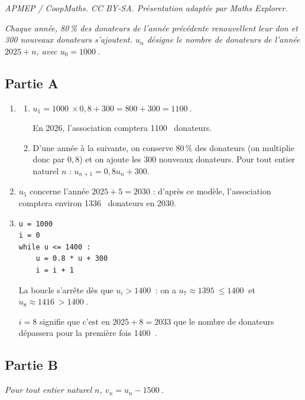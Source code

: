 \documentclass[10pt]{article}
\providecommand{\np}[2][]{{#2~#1}}
\begin{document}
\noindent\textit{APMEP / CoopMaths. CC BY-SA. Présentation adaptée par Maths Explorer.}\par\medskip
\emph{Chaque année, 80\,\% des donateurs de l'année précédente renouvellent leur don et
300 nouveaux donateurs s'ajoutent. $u_n$ désigne le nombre de donateurs de l'année
$2025 + n$, avec $u_0 = \np{1000}$.}

\subsection*{Partie A}

\begin{enumerate}
	\item
	\begin{enumerate}
		\item $u_1 = \np{1000} \times 0,8 + 300 = 800 + 300 = \np{1100}$.

		En 2026, l'association comptera \np{1100} donateurs.

		\item D'une année à la suivante, on conserve 80\,\% des donateurs (on multiplie donc par $0,8$)
		et on ajoute les 300 nouveaux donateurs. Pour tout entier naturel $n$ :
		$u_{n+1} = 0,8u_n + 300$.
	\end{enumerate}

	\item $u_5$ concerne l'année $2025 + 5 = 2030$ : d'après ce modèle, l'association comptera environ \np{1336} donateurs en 2030.

	\item
	\begin{lstlisting}[style=python,xleftmargin=4.5cm,xrightmargin=4.5cm,numbers=none]
u = 1000
i = 0
while u <= 1400 :
    u = 0.8 * u + 300
    i = i + 1
\end{lstlisting}

	La boucle s'arrête dès que $u_i > \np{1400}$ : on a $u_7 \approx \np{1395} \leqslant \np{1400}$ et $u_8 \approx \np{1416} > \np{1400}$.

	$i = 8$ signifie que c'est en
	$2025 + 8 = 2033$ que le nombre de donateurs dépassera pour la première fois
	\np{1400}.
\end{enumerate}

\subsection*{Partie B}

\emph{Pour tout entier naturel $n$, $v_n = u_n - \np{1500}$.}
\end{document}
